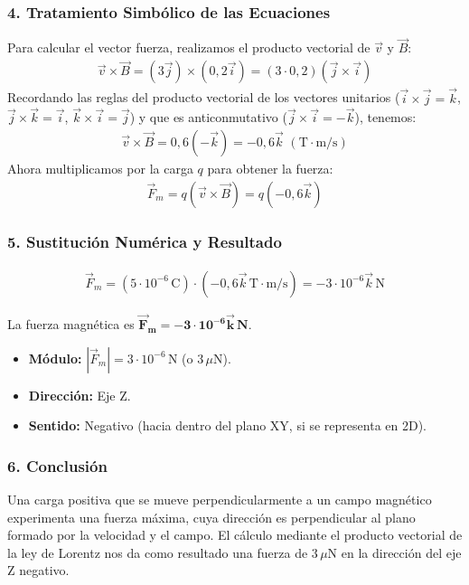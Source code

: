\subsubsection*{4. Tratamiento Simbólico de las Ecuaciones}
Para calcular el vector fuerza, realizamos el producto vectorial de $\vec{v}$ y $\vec{B}$:
\begin{gather}
    \vec{v} \times \vec{B} = (3\vec{j}) \times (0,2\vec{i}) = (3 \cdot 0,2)(\vec{j} \times \vec{i})
\end{gather}
Recordando las reglas del producto vectorial de los vectores unitarios ($\vec{i}\times\vec{j}=\vec{k}$, $\vec{j}\times\vec{k}=\vec{i}$, $\vec{k}\times\vec{i}=\vec{j}$) y que es anticonmutativo ($\vec{j}\times\vec{i} = -\vec{k}$), tenemos:
\begin{gather}
    \vec{v} \times \vec{B} = 0,6(-\vec{k}) = -0,6\vec{k} \, \, (\text{T} \cdot \text{m/s})
\end{gather}
Ahora multiplicamos por la carga $q$ para obtener la fuerza:
\begin{gather}
    \vec{F}_m = q (\vec{v} \times \vec{B}) = q(-0,6\vec{k})
\end{gather}

\subsubsection*{5. Sustitución Numérica y Resultado}
\begin{gather}
    \vec{F}_m = (5 \cdot 10^{-6} \, \text{C}) \cdot (-0,6\vec{k} \, \text{T} \cdot \text{m/s}) = -3 \cdot 10^{-6} \vec{k} \, \text{N}
\end{gather}
\begin{cajaresultado}
La fuerza magnética es $\boldsymbol{\vec{F}_m = -3 \cdot 10^{-6} \vec{k} \, \textbf{N}}$.
\begin{itemize}
    \item \textbf{Módulo:} $|\vec{F}_m| = 3 \cdot 10^{-6} \, \text{N}$ (o $3\,\mu\text{N}$).
    \item \textbf{Dirección:} Eje Z.
    \item \textbf{Sentido:} Negativo (hacia dentro del plano XY, si se representa en 2D).
\end{itemize}
\end{cajaresultado}

\subsubsection*{6. Conclusión}
\begin{cajaconclusion}
Una carga positiva que se mueve perpendicularmente a un campo magnético experimenta una fuerza máxima, cuya dirección es perpendicular al plano formado por la velocidad y el campo. El cálculo mediante el producto vectorial de la ley de Lorentz nos da como resultado una fuerza de $3\,\mu\text{N}$ en la dirección del eje Z negativo.
\end{cajaconclusion}

